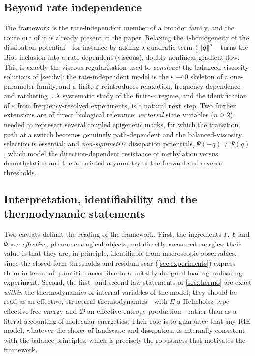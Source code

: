\subsection{Beyond rate independence}\label{sec:beyond_ri}

The framework is the rate-independent member of a broader family, and
the route out of it is already present in the paper. Relaxing the
$1$-homogeneity of the dissipation potential---for instance by adding a
quadratic term $\tfrac{\varepsilon}{2}\|\dot{\bm{q}}\|^2$---turns the
Biot inclusion into a rate-dependent (viscous), doubly-nonlinear
gradient flow. This is exactly the viscous regularisation used to
\emph{construct} the balanced-viscosity solutions of \cref{sec:bv}: the
rate-independent model is the $\varepsilon\to0$ skeleton of a
one-parameter family, and a finite $\varepsilon$ reintroduces relaxation,
frequency dependence and ratcheting~\cite{mielke2012bv,MielkeRoubicek}.
A systematic study of the finite-$\varepsilon$ regime, and the
identification of $\varepsilon$ from frequency-resolved experiments, is a
natural next step. Two further extensions are of direct biological
relevance: \emph{vectorial} state variables ($n\ge2$), needed to
represent several coupled epigenetic marks, for which the transition
path at a switch becomes genuinely path-dependent and the
balanced-viscosity selection is essential; and \emph{non-symmetric}
dissipation potentials, $\Psi(-\dot q)\ne\Psi(\dot q)$, which model the
direction-dependent resistance of methylation versus demethylation and
the associated asymmetry of the forward and reverse thresholds.

\subsection{Interpretation, identifiability and the thermodynamic
statements}\label{sec:interpretation}

Two caveats delimit the reading of the framework. First, the
ingredients $F$, $\bm{\ell}$ and $\Psi$ are \emph{effective},
phenomenological objects, not directly measured energies; their value is
that they are, in principle, identifiable from macroscopic observables,
since the closed-form thresholds and residual scar
(\cref{sec:experiments}) express them in terms of quantities accessible to a suitably
designed loading--unloading experiment. Second, the first- and
second-law statements of \cref{sec:thermo} are exact \emph{within} the
thermodynamics of internal variables of the model; they should be read
as an effective, structural thermodynamics---with $E$ a Helmholtz-type
effective free energy and $\mathcal D$ an effective entropy
production---rather than as a literal accounting of molecular energetics.
Their role is to guarantee that any RIE model, whatever the choice of
landscape and dissipation, is internally consistent with the balance
principles, which is precisely the robustness that motivates the
framework.

